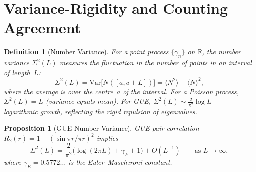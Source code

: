 \documentclass[11pt,a4paper]{article}
\theoremstyle{plain}
\newtheorem{proposition}[theorem]{Proposition}
\newtheorem{definition}[theorem]{Definition}
\theoremstyle{remark}
\newcommand{\R}{\mathbb{R}}
\begin{document}
\section{Variance-Rigidity and Counting Agreement}
\label{sec:variance-rigidity}

\begin{definition}[Number Variance]\label{def:number-variance}
For a point process $\{\gamma_n\}$ on $\R$, the \emph{number variance}
$\Sigma^2(L)$ measures the fluctuation in the number of points in an
interval of length~$L$:
\begin{equation}\label{eq:sigma2-def}
  \Sigma^2(L)=\mathrm{Var}\bigl[N([a,a+L])\bigr]
  =\langle N^2\rangle-\langle N\rangle^2,
\end{equation}
where the average is over the centre~$a$ of the interval.
For a Poisson process, $\Sigma^2(L)=L$ (variance equals mean).
For GUE, $\Sigma^2(L)\sim\frac{2}{\pi^2}\log L$ --- logarithmic
growth, reflecting the rigid repulsion of eigenvalues.
\end{definition}

\begin{proposition}[GUE Number Variance]\label{prop:number-variance}
GUE pair correlation $R_2(r)=1-(\sin\pi r/\pi r)^2$ implies
\begin{equation}\label{eq:sigma2-GUE}
  \Sigma^2(L)=\frac{2}{\pi^2}\bigl(\log(2\pi L)+\gamma_E+1\bigr)+O(L^{-1})
  \qquad\text{as }L\to\infty,
\end{equation}
where $\gamma_E=0.5772\ldots$ is the Euler--Mascheroni constant.
\end{proposition}
\end{document}
